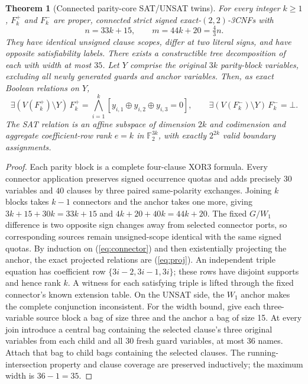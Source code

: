 \documentclass[10pt]{article}
\newtheorem{theorem}{Theorem}
\begin{document}
\begin{theorem}[Connected parity-core SAT/UNSAT twins]\label{thm:twins}
For every integer $k\ge1$, $F_k^+$ and $F_k^-$ are proper, connected strict signed exact-$(2,2)$-3CNFs with
\begin{equation}\label{eq:sizes}
 n=33k+15,\qquad m=44k+20=\tfrac43n.
\end{equation}
They have identical unsigned clause scopes, differ at two literal signs, and have opposite satisfiability labels. There exists a constructible tree decomposition of each with width at most $35$. Let $Y$ comprise the original $3k$ parity-block variables, excluding all newly generated guards and anchor variables. Then, as exact Boolean relations on $Y$,
\begin{equation}\label{eq:proj}
\exists (V(F_k^+)\setminus Y)\,F_k^+
=\bigwedge_{i=1}^k [y_{i,1}\oplus y_{i,2}\oplus y_{i,3}=0],
\qquad
\exists (V(F_k^-)\setminus Y)\,F_k^- =\bot.
\end{equation}
The SAT relation is an affine subspace of dimension $2k$ and codimension and aggregate coefficient-row rank $e=k$ in $\mathbb F_2^{3k}$, with exactly $2^{2k}$ valid boundary assignments.
\end{theorem}
\begin{proof}
Each parity block is a complete four-clause XOR3 formula. Every connector application preserves signed occurrence quotas and adds precisely $30$ variables and $40$ clauses by three paired same-polarity exchanges. Joining $k$ blocks takes $k-1$ connectors and the anchor takes one more, giving $3k+15+30k=33k+15$ and $4k+20+40k=44k+20$. The fixed $G/W_1$ difference is two opposite sign changes away from selected connector ports, so corresponding sources remain unsigned-scope identical with the same signed quotas. By induction on (\ref{eq:connector}) and then existentially projecting the anchor, the exact projected relations are (\ref{eq:proj}). An independent triple equation has coefficient row $\{3i-2,3i-1,3i\}$; these rows have disjoint supports and hence rank $k$. A witness for each satisfying triple is lifted through the fixed connector's known extension table. On the UNSAT side, the $W_1$ anchor makes the complete conjunction inconsistent. For the width bound, give each three-variable source block a bag of size three and the anchor a bag of size 15. At every join introduce a central bag containing the selected clause's three original variables from each child and all 30 fresh guard variables, at most 36 names. Attach that bag to child bags containing the selected clauses. The running-intersection property and clause coverage are preserved inductively; the maximum width is $36-1=35$.
\end{proof}
\end{document}
